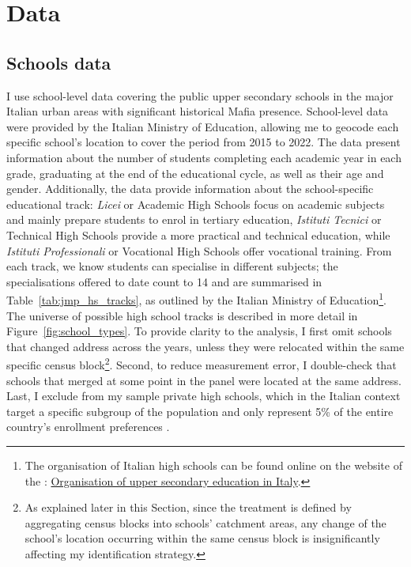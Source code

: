 \documentclass[12pt]{article}
\theoremstyle{plain}
\theoremstyle{plain}
\theoremstyle{plain}
\theoremstyle{definition}
\theoremstyle{plain}
\theoremstyle{definition}
\theoremstyle{plain}
\theoremstyle{remark}
\theoremstyle{definition}
\theoremstyle{definition}
\theoremstyle{plain}
\begin{document}
\FloatBarrier
\section{Data}
\label{sec:jmp_data}
\FloatBarrier
\subsection{Schools data}
\label{sec:jmp_schools_data}
 I use school-level data covering the public upper secondary schools in the major Italian urban areas with significant historical Mafia presence.  School-level data were provided by the Italian Ministry of Education, allowing me to geocode each specific school's location to cover the period from 2015 to 2022. The data present information about the number of students completing each academic year in each grade, graduating at the end of the educational cycle, as well as their age and gender. Additionally, the data provide information about the school-specific educational track: \emph{Licei} or Academic High Schools focus on academic subjects and mainly prepare students to enrol in tertiary education, \emph{Istituti Tecnici} or Technical High Schools provide a more practical and technical education, while \emph{Istituti Professionali} or Vocational High Schools offer vocational training. From each track, we know students can specialise in different subjects; the specialisations offered to date count to 14 and are summarised in Table~\ref{tab:jmp_hs_tracks}, as outlined by the Italian Ministry of Education\footnote{The organisation of Italian high schools can be found online on the website of the \citet{ministry_of_education_scuola_2024}: \href{https://www.mim.gov.it/web/guest/scuola-secondaria-di-secondo-grado}{Organisation of upper secondary education in Italy}.}. The universe of possible high school tracks is described in more detail in Figure~\ref{fig:school_types}. To provide clarity to the analysis, I first omit schools that changed address across the years, unless they were relocated within the same specific census block\footnote{As explained later in this Section, since the treatment is defined by aggregating census blocks into schools' catchment areas, any change of the school's location occurring within the same census block is insignificantly affecting my identification strategy.}. Second, to reduce measurement error, I double-check that schools that merged at some point in the panel were located at the same address.
Last, I exclude from my sample private high schools, which in the Italian context target a specific subgroup of the population and only represent 5\% of the entire country's enrollment preferences \citep{istat_istruzione_2021}. 
\end{document}
